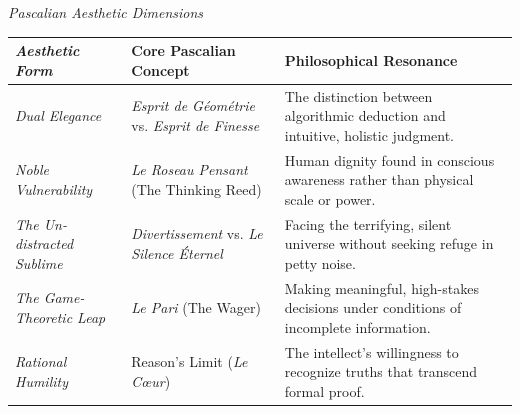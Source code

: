 \documentclass[11pt]{article}
\begin{document}
\emph{Pascalian Aesthetic Dimensions}
\begin{table}[H]
\centering
\begin{tabular}{@{}p{3cm}p{6cm}p{6cm}@{}}
\toprule
\emph{Aesthetic Form} & \textbf{Core Pascalian Concept} & \textbf{Philosophical Resonance} \\
\midrule
\emph{Dual Elegance} & \textit{Esprit de G\'eom\'etrie} vs. \textit{Esprit de Finesse} & The distinction between algorithmic deduction and intuitive, holistic judgment. \\

\emph{Noble Vulnerability} & \textit{Le Roseau Pensant} (The Thinking Reed) & Human dignity found in conscious awareness rather than physical scale or power. \\

\emph{The Un-distracted Sublime} & \textit{Divertissement} vs. \textit{Le Silence \'Eternel} & Facing the terrifying, silent universe without seeking refuge in petty noise. \\

\emph{The Game-Theoretic Leap} & \textit{Le Pari} (The Wager) & Making meaningful, high-stakes decisions under conditions of incomplete information. \\

\emph{Rational Humility} & Reason's Limit (\textit{Le C\oe ur}) & The intellect's willingness to recognize truths that transcend formal proof. \\
\bottomrule
\end{tabular}
\end{table}
\end{document}
